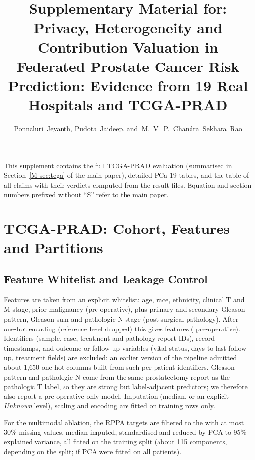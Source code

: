 \documentclass[journal]{IEEEtran}
\begin{document}
\title{Supplementary Material for: Privacy, Heterogeneity and Contribution Valuation in Federated Prostate Cancer Risk Prediction: Evidence from 19 Real Hospitals and TCGA-PRAD}
\author{Ponnaluri~Jeyanth, Pudota~Jaideep, and~M.~V.~P.~Chandra~Sekhara~Rao}
\maketitle

This supplement contains the full TCGA-PRAD evaluation (summarised in Section~\ref{M-sec:tcga} of the main paper), detailed PCa-19 tables, and the table of all claims with their verdicts computed from the result files. Equation and section numbers prefixed without ``S'' refer to the main paper.

\section{TCGA-PRAD: Cohort, Features and Partitions}
\subsection{Feature Whitelist and Leakage Control}
Features are taken from an explicit whitelist: age, race, ethnicity, clinical T and M stage, prior malignancy (pre-operative), plus primary and secondary Gleason pattern, Gleason sum and pathologic N stage (post-surgical pathology). After one-hot encoding (reference level dropped) this gives \nFeatFull{} features (\nFeatPreop{} pre-operative). Identifiers (sample, case, treatment and pathology-report IDs), record timestamps, and outcome or follow-up variables (vital status, days to last follow-up, treatment fields) are excluded; an earlier version of the pipeline admitted about 1{,}650 one-hot columns built from such per-patient identifiers. Gleason pattern and pathologic N come from the same prostatectomy report as the pathologic T label, so they are strong but label-adjacent predictors; we therefore also report a pre-operative-only model. Imputation (median, or an explicit \emph{Unknown} level), scaling and encoding are fitted on training rows only.

For the multimodal ablation, the \nProteinRaw{} RPPA targets are filtered to the \nProteinKept{} with at most 30\% missing values, median-imputed, standardised and reduced by PCA to 95\% explained variance, all fitted on the training split (about 115 components, depending on the split; \nPCAll{} if PCA were fitted on all \nMatched{} patients).
\end{document}
